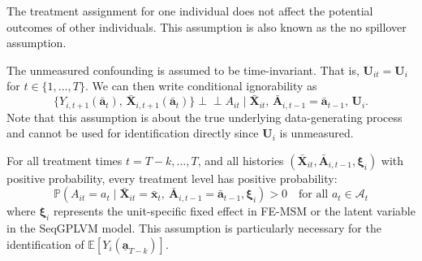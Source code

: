 \begin{idassumpC}[No interference]\label{ass:C-no-interference}
The treatment assignment for one individual does not affect the potential outcomes of
other individuals. This assumption is also known as the no spillover assumption.
\end{idassumpC}

\begin{idassumpC}\label{ass:C-timeinvariant-uc}
The unmeasured confounding is assumed to be
time-invariant. That is, $\mathbf{U}_{it} = \mathbf{U}_i$ for $t \in \{1,\dots,T\}$. We can then write 
conditional ignorability as 
\[
\{ Y_{i,t+1}(\bar{\mathbf{a}}_{t}),\, \bar{\mathbf{X}}_{i,t+1}(\bar{\mathbf{a}}_{t}) \}
\perp\!\!\!\perp
A_{it}
\mid
\bar{\mathbf{X}}_{it},\,
\bar{\mathbf{A}}_{i,t-1} = \bar{\mathbf{a}}_{t-1},\,
\mathbf{U}_i .
\]
Note that this assumption is about the true underlying data-generating process and cannot be  
used for identification directly since $\mathbf{U}_i$ is unmeasured. 
\end{idassumpC}

\begin{idassumpC}[Positivity]\label{ass:C-positivity}
For all treatment times $t = T-k, \ldots, T$, 
and all histories $(\bar{\mathbf{X}}_{it}, \bar{\mathbf{A}}_{i,t-1}, \boldsymbol{\xi}_i)$ 
with positive probability, every treatment level has positive probability:
\[
\mathbb{P}(A_{it} = a_t \mid \bar{\mathbf{X}}_{it} = \bar{\mathbf{x}}_t,\ \bar{\mathbf{A}}_{i,t-1} = 
\bar{\mathbf{a}}_{t-1}, \boldsymbol{\xi}_i) > 0 \quad \text{for all } a_t \in \mathcal{A}_t
\]
where $\boldsymbol{\xi}_i$ represents the unit-specific fixed effect in FE-MSM 
or the latent variable in the SeqGPLVM model. This assumption is particularly 
necessary for the identification of $\mathbb{E}[Y_i(\underline{\mathbf{a}}_{T-k})]$.
\end{idassumpC}


